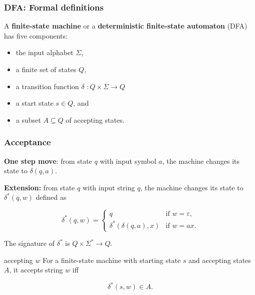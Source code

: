 

\newcommand\sbullet[1][.5]{\mathbin{\vcenter{\hbox{\scalebox{#1}{$\bullet$}}}}}

\renewcommand{\epsilon}{\varepsilon}

\newcommand{\czero}{{\mathtt 0}}
\newcommand{\cone}{{\mathtt 1}}

\begin{frame}
  \frametitle{DFA: Formal definitions}

  A {\color{red}\bf finite-state machine} or a {\color{red}\bf
    deterministic finite-state automaton} (DFA) has five components:

  \begin{itemize}
  \item the input alphabet $\Sigma$,
  \item a finite set of states $Q$,
  \item a transition function $\delta$ $:Q\times\Sigma \longrightarrow Q$
  \item a start state $s\in Q$, and
  \item a subset $A\subseteq Q$ of accepting states.
  \end{itemize}
  
\end{frame}

\begin{frame}
  \frametitle{Acceptance}

  {\bf One step move}: from state $q$ with input symbol $a$, the
  machine changes its state to $\delta(q,a)$.

  {\bf Extension:} from state $q$ with input string $q$, the machine
  changes its state to $\delta^*(q,w)$ defined as

  \begin{block}{}
  \[
  \delta^*(q,w) = \left\{
  \begin{array}{ll}
    q & \mbox{if $w=\epsilon$,} \\
    \delta^*(\delta(q,a),x) & \mbox{if $w=ax$.}
  \end{array}
  \right.
  \]
  \end{block}
  
  The signature of $\delta^*$ is $Q\times\Sigma^* \longrightarrow Q$.

  \begin{block}{accepting $w$}   
    For a finite-state machine with starting state $s$ and accepting
    states $A$, it accepts string $w$ iff
    
    \[
    \delta^*(s,w)\in A.
    \]
  \end{block}
\end{frame}

